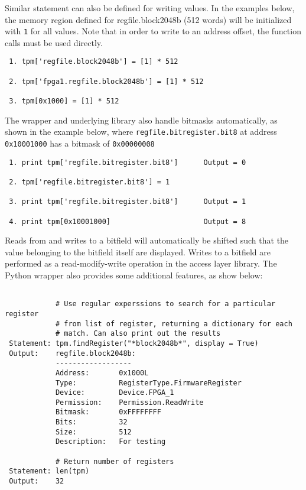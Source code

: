 \documentclass[a4paper,11pt]{article}
\begin{document}
Similar statement can also be defined for writing values. In the examples 
below, the memory region defined for regfile.block2048b (512 words) will be 
initialized with \texttt{1} for all values. Note that in order to write to an 
address offset, the function calls must be used directly.

\begin{lstlisting}
 1. tpm['regfile.block2048b'] = [1] * 512
 
 2. tpm['fpga1.regfile.block2048b'] = [1] * 512
 
 3. tpm[0x1000] = [1] * 512
\end{lstlisting}

The wrapper and underlying library also handle bitmasks automatically, as shown 
in the example below, where \texttt{regfile.bitregister.bit8} at address 
\texttt{0x10001000} has a bitmask of \texttt{0x00000008}

\begin{lstlisting}
 1. print tpm['regfile.bitregister.bit8']      Output = 0

 2. tpm['regfile.bitregister.bit8'] = 1
 
 3. print tpm['regfile.bitregister.bit8']      Output = 1
    
 4. print tpm[0x10001000]                      Output = 8
\end{lstlisting}

Reads from and writes to a bitfield will automatically be shifted such that the 
value belonging to the bitfield itself are displayed. Writes to a bitfield are 
performed as a read-modify-write operation in the access layer library. The 
Python wrapper also provides some additional features, as show below:

\begin{lstlisting}
 
            # Use regular experssions to search for a particular register 
            # from list of register, returning a dictionary for each 
            # match. Can also print out the results
 Statement: tpm.findRegister("*block2048b*", display = True)
 Output:    regfile.block2048b:
            ------------------
            Address:       0x1000L
            Type:          RegisterType.FirmwareRegister
            Device:        Device.FPGA_1
            Permission:    Permission.ReadWrite
            Bitmask:       0xFFFFFFFF
            Bits:          32
            Size:          512
            Description:   For testing
            
            # Return number of registers
 Statement: len(tpm)
 Output:    32
 
\end{lstlisting}
\end{document}
